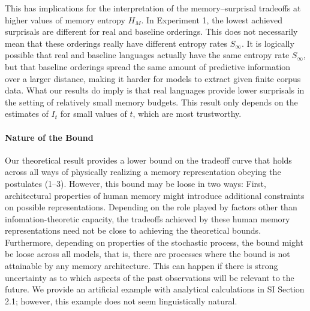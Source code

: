 This has implications for the interpretation of the memory--surprisal tradeoffs at higher values of memory entropy $H_M$.
In Experiment 1, the lowest achieved surprisals are different for real and baseline orderings.
This does not necessarily mean that these orderings really have different entropy rates $S_\infty$.
It is logically possible that real and baseline languages actually have the same entropy rate $S_\infty$, but that baseline orderings spread the same amount of predictive information over a larger distance, making it harder for models to extract given finite corpus data.
What our results do imply is that real languages provide lower surprisals in the setting of relatively small memory budgets. This result only depends on the estimates of $I_t$ for small values of $t$, which are most trustworthy.


\paragraph{Nature of the Bound}
Our theoretical result provides a lower bound on the tradeoff curve that holds across all ways of physically realizing a memory representation obeying the postulates (1--3).
However, this bound may be loose in two ways:
First, architectural properties of human memory might introduce additional constraints on possible representations.
Depending on the role played by factors other than infomation-theoretic capacity, the tradeoffs achieved by these human memory representations need not be close to achieving the theoretical bounds.
Furthermore, depending on properties of the stochastic process, the bound might be loose across all models, that is, there are processes where the bound is not attainable by any memory architecture.
This can happen if there is strong uncertainty as to which aspects of the past observations will be relevant to the future.
We provide an artificial example with analytical calculations in SI Section 2.1; however, this example does not seem linguistically natural.

